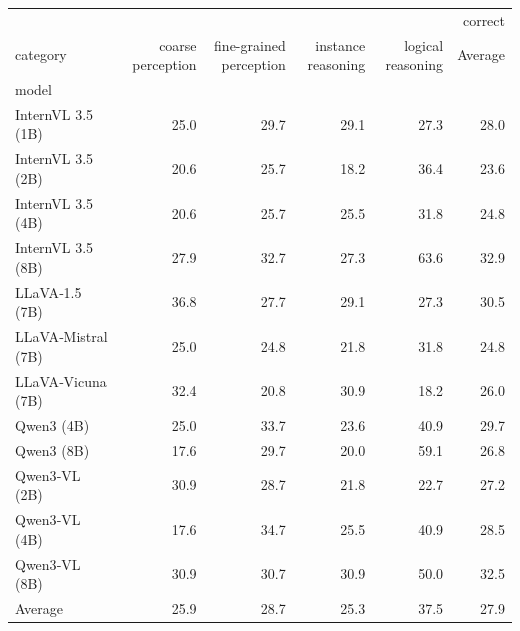 \begin{tabular}{lrrrrr}
\toprule
 & \multicolumn{5}{r}{correct} \\
category & coarse perception & fine-grained perception & instance reasoning & logical reasoning & Average \\
model &  &  &  &  &  \\
\midrule
InternVL 3.5 (1B) & 25.0 & 29.7 & 29.1 & 27.3 & 28.0 \\
InternVL 3.5 (2B) & 20.6 & 25.7 & 18.2 & 36.4 & 23.6 \\
InternVL 3.5 (4B) & 20.6 & 25.7 & 25.5 & 31.8 & 24.8 \\
InternVL 3.5 (8B) & 27.9 & 32.7 & 27.3 & 63.6 & 32.9 \\
LLaVA‑1.5 (7B) & 36.8 & 27.7 & 29.1 & 27.3 & 30.5 \\
LLaVA‑Mistral (7B) & 25.0 & 24.8 & 21.8 & 31.8 & 24.8 \\
LLaVA‑Vicuna (7B) & 32.4 & 20.8 & 30.9 & 18.2 & 26.0 \\
Qwen3 (4B) & 25.0 & 33.7 & 23.6 & 40.9 & 29.7 \\
Qwen3 (8B) & 17.6 & 29.7 & 20.0 & 59.1 & 26.8 \\
Qwen3‑VL (2B) & 30.9 & 28.7 & 21.8 & 22.7 & 27.2 \\
Qwen3‑VL (4B) & 17.6 & 34.7 & 25.5 & 40.9 & 28.5 \\
Qwen3‑VL (8B) & 30.9 & 30.7 & 30.9 & 50.0 & 32.5 \\
Average & 25.9 & 28.7 & 25.3 & 37.5 & 27.9 \\
\bottomrule
\end{tabular}
